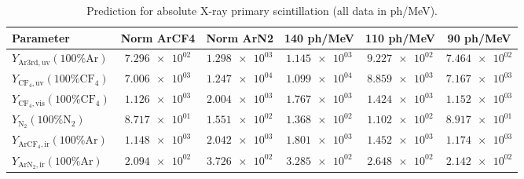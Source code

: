 \begin{table}
\caption{Prediction for absolute X-ray primary scintillation (all data in ph/MeV).}
\label{tab:prediction}
\begin{tabular}{lSSSSS}
\toprule
{Parameter} & {Norm ArCF4} & {Norm ArN2} & {140 ph/MeV} & {110 ph/MeV} & {90 ph/MeV} \\
\midrule
$Y_{\mathrm{Ar3rd,uv}} (100\% \mathrm{Ar})$ & $\num{7.296e+02}$ & $\num{1.298e+03}$ & $\num{1.145e+03}$ & $\num{9.227e+02}$ & $\num{7.464e+02}$ \\
$Y_{\mathrm{CF_4,uv}} (100\% \mathrm{CF_4})$ & $\num{7.006e+03}$ & $\num{1.247e+04}$ & $\num{1.099e+04}$ & $\num{8.859e+03}$ & $\num{7.167e+03}$ \\
$Y_{\mathrm{CF_4,vis}} (100\% \mathrm{CF_4})$ & $\num{1.126e+03}$ & $\num{2.004e+03}$ & $\num{1.767e+03}$ & $\num{1.424e+03}$ & $\num{1.152e+03}$ \\
$Y_{\mathrm{N_2}} (100\% \mathrm{N_2})$ & $\num{8.717e+01}$ & $\num{1.551e+02}$ & $\num{1.368e+02}$ & $\num{1.102e+02}$ & $\num{8.917e+01}$ \\
$Y_{\mathrm{ArCF_4,ir}} (100\% \mathrm{Ar})$ & $\num{1.148e+03}$ & $\num{2.042e+03}$ & $\num{1.801e+03}$ & $\num{1.452e+03}$ & $\num{1.174e+03}$ \\
$Y_{\mathrm{ArN_2,ir}} (100\% \mathrm{Ar})$ & $\num{2.094e+02}$ & $\num{3.726e+02}$ & $\num{3.285e+02}$ & $\num{2.648e+02}$ & $\num{2.142e+02}$ \\
\bottomrule
\end{tabular}
\end{table}
